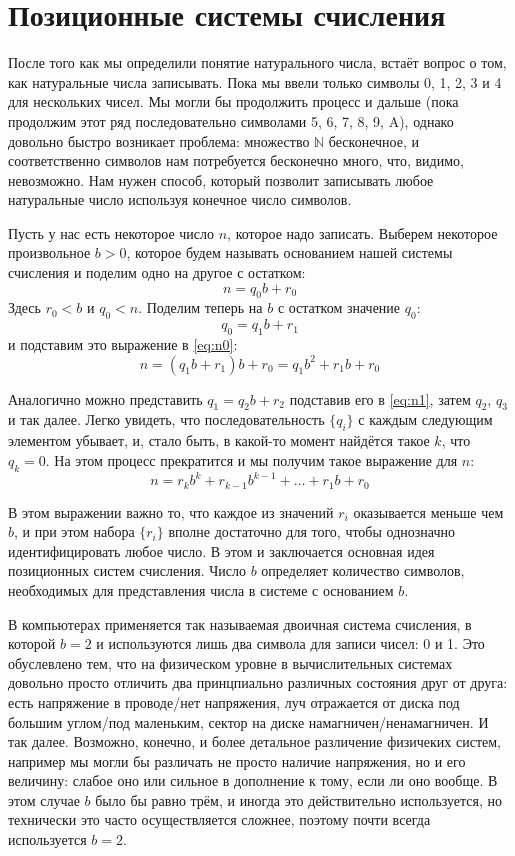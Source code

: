 \section{Позиционные системы счисления}

После того как мы определили понятие натурального числа, встаёт вопрос о том, как натуральные числа записывать. Пока мы ввели только символы 0, 1, 2, 3 и 4 для нескольких чисел. Мы могли бы продолжить процесс и дальше (пока продолжим этот ряд последовательно символами 5, 6, 7, 8, 9, A), однако довольно быстро возникает проблема: множество $\mathbb{N}$ бесконечное, и соответственно символов нам потребуется бесконечно много, что, видимо, невозможно. Нам нужен способ, который позволит записывать любое натуральные число используя конечное число символов.

Пусть у нас есть некоторое число $n$, которое надо записать. Выберем некоторое произвольное $b > 0$, которое будем называть основанием нашей системы счисления и поделим одно на другое с остатком:
\begin{equation}\label{eq:n0}
n = q_0b + r_0
\end{equation}
Здесь $r_0 < b$ и $q_0 < n$. Поделим теперь на $b$ с остатком значение $q_0$: $$q_0 = q_1b + r_1$$ и подставим это выражение в \eqref{eq:n0}:
\begin{equation}\label{eq:n1}
n = (q_1b + r_1)b + r_0 = q_1b^2 + r_1b + r_0
\end{equation}

Аналогично можно представить $q_1 = q_2b + r_2$ подставив его в \eqref{eq:n1}, затем $q_2$, $q_3$ и так далее. Легко увидеть, что последовательность $\{q_i\}$ с каждым следующим элементом убывает, и, стало быть, в какой-то момент найдётся такое $k$, что $q_k = 0$. На этом процесс прекратится и мы получим такое выражение для $n$:
\begin{equation}\label{eq:nk}
n = r_kb^k + r_{k-1}b^{k-1} +\ldots + r_1b + r_0
\end{equation}

В этом выражении важно то, что каждое из значений $r_i$ оказывается меньше чем $b$, и при этом набора $\{r_i\}$ вполне достаточно для того, чтобы однозначно идентифицировать любое число. В этом и заключается основная идея позиционных систем счисления. Число $b$ определяет количество символов, необходимых для представления числа в системе с основанием $b$.

В компьютерах применяется так называемая двоичная система счисления, в которой $b=2$ и используются лишь два символа для записи чисел: 0 и 1. Это обуслевлено тем, что на физическом уровне в вычислительных системах довольно просто отличить два принцпиально различных состояния друг от друга: есть напряжение в проводе/нет напряжения, луч отражается от диска под большим углом/под маленьким, сектор на диске намагничен/ненамагничен. И так далее. Возможно, конечно, и более детальное различение физичеких систем, например мы могли бы различать не просто наличие напряжения, но и его величину: слабое оно или сильное в дополнение к тому, если ли оно вообще. В этом случае $b$ было бы равно трём, и иногда это действительно используется, но технически это часто осуществляется сложнее, поэтому почти всегда используется $b=2$.

